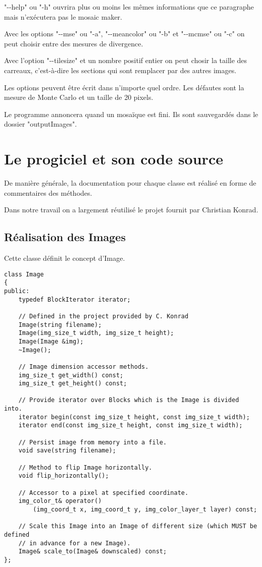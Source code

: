 \documentclass[a4paper]{article}
\begin{document}
"{-}{-}help" ou "-h" ouvrira plus ou moins les m\^emes informations que ce paragraphe mais n'ex\'ecutera pas le mosaic maker.

Avec les options "{-}{-}mse" ou "-a", "{-}{-}meancolor" ou "-b" et "{-}{-}mcmse" ou "-c" on peut choisir entre des mesures de divergence.

Avec l'option "{-}{-}tilesize" et un nombre positif entier on peut chosir la taille des carreaux, c'est-\`a-dire les sections qui sont remplacer par des autres images.

Les options peuvent \^etre \'ecrit dans n'importe quel ordre.
Les d\'efautes sont la mesure de Monte Carlo et un taille de 20 pixels.

Le programme annoncera quand un mosa\"ique est fini.
 Ils sont sauvegard\'es dans le dossier "outputImages". 

\section{Le progiciel et son code source}
De mani\`ere g\'en\'erale, la documentation pour chaque classe est r\'ealis\'e en forme de commentaires des m\'ethodes.

Dans notre travail on a largement r\'eutilis\'e le projet fournit par Christian Konrad.

\subsection{R\'ealisation des Images}
Cette classe d\'efinit le concept d'Image.

\begin{lstlisting}
class Image
{
public: 
	typedef BlockIterator iterator;
	
	// Defined in the project provided by C. Konrad
	Image(string filename);
	Image(img_size_t width, img_size_t height);
	Image(Image &img);
	~Image();
	
	// Image dimension accessor methods.
	img_size_t get_width() const;
	img_size_t get_height() const;
	
	// Provide iterator over Blocks which is the Image is divided into.
	iterator begin(const img_size_t height, const img_size_t width);
	iterator end(const img_size_t height, const img_size_t width);
	
	// Persist image from memory into a file.
	void save(string filename);
	
	// Method to flip Image horizontally.
	void flip_horizontally();
	
	// Accessor to a pixel at specified coordinate.
	img_color_t& operator()
		(img_coord_t x, img_coord_t y, img_color_layer_t layer) const;
	
	// Scale this Image into an Image of different size (which MUST be defined
	// in advance for a new Image).
	Image& scale_to(Image& downscaled) const; 
};
\end{lstlisting}
\end{document}
